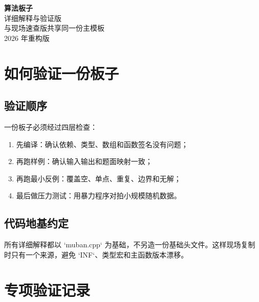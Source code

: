 
\renewcommand{\handbooktitle}{算法板子详细验证版}


\begin{titlepage}
\centering
\vspace*{5cm}
{\Huge\bfseries 算法板子}\\[1.2cm]
{\Large 详细解释与验证版}\\[1cm]
{\large 与现场速查版共享同一份主模板}\\
\vfill
{\large 2026 年重构版}
\end{titlepage}

\tableofcontents
\chapter*{如何验证一份板子}

\section*{验证顺序}

一份板子必须经过四层检查：

\begin{enumerate}
\item 先编译：确认依赖、类型、数组和函数签名没有问题；
\item 再跑样例：确认输入输出和题面映射一致；
\item 再跑最小反例：覆盖空、单点、重复、边界和无解；
\item 最后做压力测试：用暴力程序对拍小规模随机数据。
\end{enumerate}

\section*{代码地基约定}

所有详细解释都以 `muban.cpp` 为基础，不另造一份基础头文件。这样现场复制时只有一个来源，避免 `INF`、类型宏和主函数版本漂移。








\chapter{专项验证记录}

